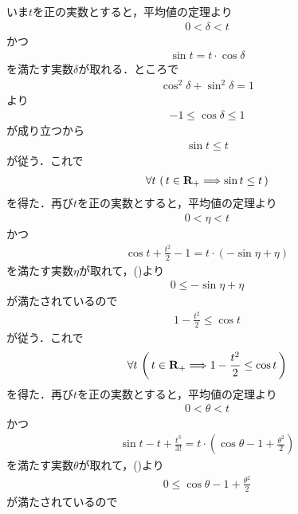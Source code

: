 	いま$t$を正の実数とすると，平均値の定理より
	\begin{align}
		0 < \delta < t
	\end{align}
	かつ
	\begin{align}
		\sin{t} = t \cdot \cos{\delta}
	\end{align}
	を満たす実数$\delta$が取れる．ところで
	\begin{align}
		\cos^2{\delta} + \sin^2{\delta} = 1
	\end{align}
	より
	\begin{align}
		-1 \leq \cos{\delta} \leq 1
	\end{align}
	が成り立つから
	\begin{align}
		\sin{t} \leq t
	\end{align}
	が従う．これで
	\begin{align}
		\forall t\, \left(\, t \in \mathbf{R}_{+} \Longrightarrow \sin{t} \leq t\, \right)
		\label{fom:existence_of_pi_1}
	\end{align}
	を得た．再び$t$を正の実数とすると，平均値の定理より
	\begin{align}
		0 < \eta < t
	\end{align}
	かつ
	\begin{align}
		\cos{t} + \frac{t^2}{2} - 1 = t \cdot (-\sin{\eta} + \eta)
	\end{align}
	を満たす実数$\eta$が取れて，()より
	\begin{align}
		0 \leq -\sin{\eta} + \eta
	\end{align}
	が満たされているので
	\begin{align}
		1 - \frac{t^2}{2} \leq \cos{t}
	\end{align}
	が従う．これで
	\begin{align}
		\forall t\, \left(\, t \in \mathbf{R}_{+} 
		\Longrightarrow 1 - \frac{t^2}{2} \leq \cos{t}\, \right)
		\label{fom:existence_of_pi_2}
	\end{align}
	を得た．再び$t$を正の実数とすると，平均値の定理より
	\begin{align}
		0 < \theta < t
	\end{align}
	かつ
	\begin{align}
		\sin{t} - t + \frac{t^3}{3!} = t \cdot \left(\cos{\theta} - 1 + \frac{\theta^2}{2}\right)
	\end{align}
	を満たす実数$\theta$が取れて，()より
	\begin{align}
		0 \leq \cos{\theta} - 1 + \frac{\theta^2}{2}
	\end{align}
	が満たされているので
